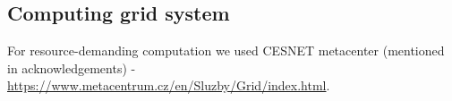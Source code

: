 \subsection*{Computing grid system}
For resource-demanding computation we used CESNET metacenter (mentioned in acknowledgements) - \url{https://www.metacentrum.cz/en/Sluzby/Grid/index.html}.






